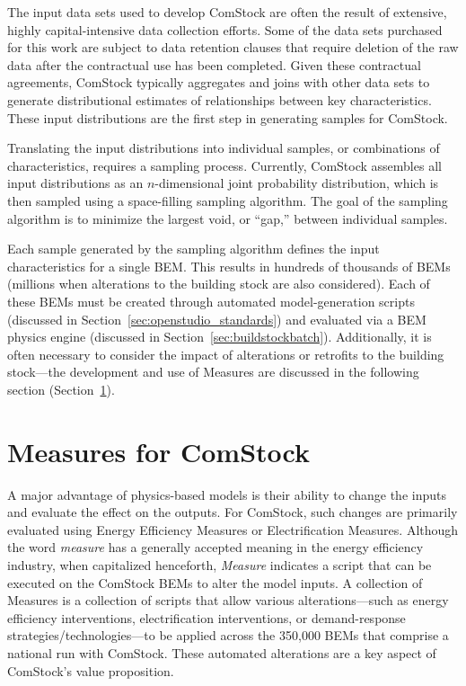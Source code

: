 The input data sets used to develop ComStock are often the result of extensive, highly capital-intensive data collection efforts. Some of the data sets purchased for this work are subject to data retention clauses that require deletion of the raw data after the contractual use has been completed. Given these contractual agreements, ComStock typically aggregates and joins with other data sets to generate distributional estimates of relationships between key characteristics. These input distributions are the first step in generating samples for ComStock.

Translating the input distributions into individual samples, or combinations of characteristics, requires a sampling process. Currently, ComStock assembles all input distributions as an $n$-dimensional joint probability distribution, which is then sampled using a space-filling sampling algorithm. The goal of the sampling algorithm is to minimize the largest void, or ``gap,'' between individual samples.

Each sample generated by the sampling algorithm defines the input characteristics for a single BEM. This results in hundreds of thousands of BEMs (millions when alterations to the building stock are also considered). Each of these BEMs must be created through automated model-generation scripts (discussed in Section~\ref{sec:openstudio_standards}) and evaluated via a BEM physics engine (discussed in Section~\ref{sec:buildstockbatch}). Additionally, it is often necessary to consider the impact of alterations or retrofits to the building stock---the development and use of Measures are discussed in the following section (Section~\ref{sec:measures}).

\section{Measures for ComStock}
\label{sec:measures}

A major advantage of physics-based models is their ability to change the inputs and evaluate the effect on the outputs. For ComStock, such changes are primarily evaluated using Energy Efficiency Measures or Electrification Measures. Although the word \emph{measure} has a generally accepted meaning in the energy efficiency industry, when capitalized henceforth, \emph{Measure} indicates a script that can be executed on the ComStock BEMs to alter the model inputs. A collection of Measures is a collection of scripts that allow various alterations---such as energy efficiency interventions, electrification interventions, or demand-response strategies/technologies---to be applied across the 350,000 BEMs that comprise a national run with ComStock. These automated alterations are a key aspect of ComStock's value proposition.

